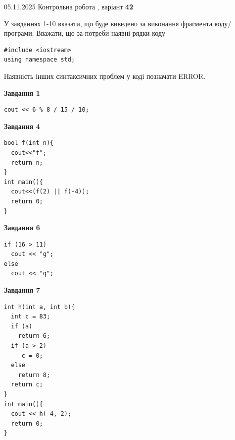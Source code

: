 \documentclass[12pt, ukrainian]{article}
\begin{document}
{\Large{05.11.2025 Контрольна робота , варіант  \No \textbf { 42 }\par}}
{
\begin {large}
У завданнях 1-10 вказати, що буде виведено за виконання фрагмента коду/про\-гра\-ми.
Вважати, що за потреби наявні рядки коду
\begin{verbatim}
#include <iostream>
using namespace std;
\end{verbatim}
Наявність інших синтаксичних проблем у коді позначати ERROR.

\begin{minipage}[t]{7.0cm}

\begin{center}
\textbf{Завдання 1}
\end{center}
\vspace{-8mm}

\begin{verbatim}
cout << 6 % 8 / 15 / 10;
\end{verbatim}



\begin{center}
\textbf{Завдання 4}
\end{center}
\vspace{-8mm}

\begin{verbatim}
bool f(int n){
  cout<<"f";
  return n;
}
int main(){
  cout<<(f(2) || f(-4));
  return 0;
}
\end{verbatim}



\begin{center}
\textbf{Завдання 6}
\end{center}
\vspace{-8mm}

\begin{verbatim}
if (16 > 11)
  cout << "g";
else
  cout << "q";
\end{verbatim}



\begin{center}
\textbf{Завдання 7}
\end{center}
\vspace{-8mm}

\begin{verbatim}
int h(int a, int b){
  int c = 83;
  if (a)
    return 6;
  if (a > 2)
     c = 0;
  else
    return 8;
  return c;
}
int main(){
  cout << h(-4, 2);
  return 0;
}
\end{verbatim}


\end{minipage}
\end{large}}
\end{document}
